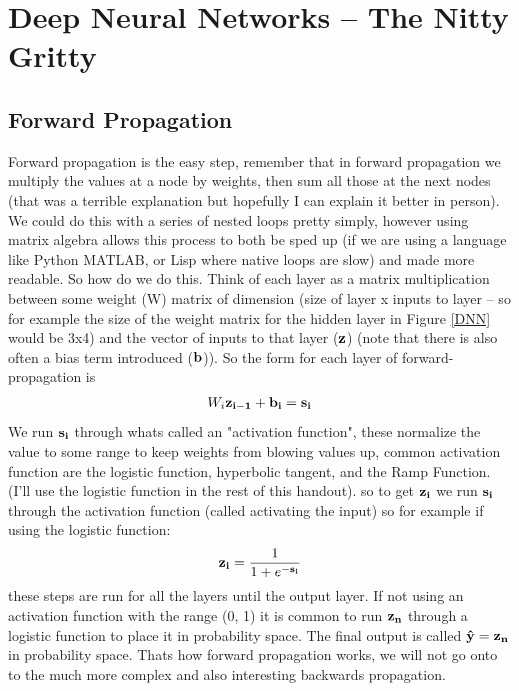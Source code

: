 \documentclass[a4paper]{article}
\begin{document}
\section{Deep Neural Networks -- The Nitty Gritty}
\subsection{Forward Propagation}
Forward propagation is the easy step, remember that in forward propagation we multiply the values at a node by weights, then sum all those at the next nodes (that was a terrible explanation but hopefully I can explain it better in person). We could do this with a series of nested loops pretty simply, however using matrix algebra allows this process to both be sped up (if we are using a language like Python MATLAB, or Lisp where native loops are slow) and made more readable. So how do we do this. Think of each layer as a matrix multiplication between some weight (W) matrix of dimension (size of layer x inputs to layer -- so for example the size of the weight matrix for the hidden layer in Figure \ref{DNN} would be 3x4) and the vector of inputs to that layer ($\vb{z}$) (note that there is also often a bias term introduced ($\vb{b}$)). So the form for each layer of forward-propagation is 
\begin{align}
	W_{i}\vb{z_{i-1}}+\vb{b_{i}} = \vb{s_{i}}
\end{align}
We run $\vb{s_{i}}$ through whats called an "activation function", these normalize the value to some range to keep weights from blowing values up, common activation function are the logistic function, hyperbolic tangent, and the Ramp Function. (I'll use the logistic function in the rest of this handout). so to get $\vb{z_{i}}$ we run $\vb{s_{i}}$ through the activation function (called activating the input) so for example if using the logistic function: 
\begin{align}
	\vb{z_{i}} = \frac{1}{1+e^{-\vb{s_{i}}}}
\end{align}
these steps are run for all the layers until the output layer. If not using an activation function with the range (0, 1) it is common to run $\vb{z_{n}}$ through a logistic function to place it in probability space. The final output is called $\vu{y} = \vb{z_{n}}$ in probability space. Thats how forward propagation works, we will not go onto to the much more complex and also interesting backwards propagation.
\end{document}
